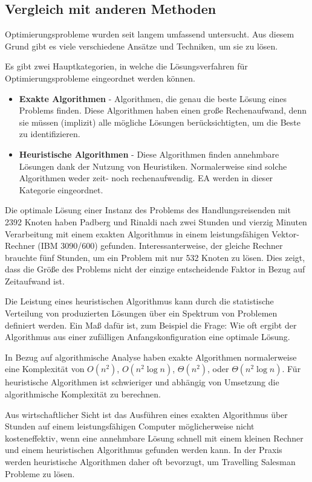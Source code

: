 \documentclass[twoside,twocolumn]{article}
\begin{document}
\subsection{Vergleich mit anderen Methoden}
Optimierungsprobleme wurden seit langem umfassend untersucht. Aus diesem Grund gibt es viele verschiedene Ansätze und Techniken, um sie zu lösen.\par
Es gibt zwei Hauptkategorien, in welche die Lösungsverfahren für Optimierungsprobleme eingeordnet werden können.
\begin{itemize}
\item{\textbf{Exakte Algorithmen} - Algorithmen, die genau die beste Lösung eines Problems finden. Diese Algorithmen haben einen große Rechenaufwand, denn sie müssen (implizit) alle mögliche Lösungen berücksichtigten, um die Beste zu identifizieren.}
\item{\textbf{Heuristische Algorithmen} - Diese Algorithmen finden annehmbare Lösungen dank der Nutzung von Heuristiken. Normalerweise sind solche Algorithmen weder zeit- noch rechenaufwendig. EA werden in dieser Kategorie eingeordnet.}
\end{itemize}

Die optimale Lösung einer Instanz des Problems des Handlungsreisenden mit 2392 Knoten haben Padberg und Rinaldi \cite{exact_algorithms_A} \cite{exact_algorithms_B} nach zwei Stunden und vierzig Minuten Verarbeitung mit einem exakten Algorithmus in einem leistungsfähigen Vektor-Rechner (IBM 3090/600) gefunden. Interessanterweise, der gleiche Rechner brauchte fünf Stunden, um ein Problem mit nur 532 Knoten zu lösen. Dies zeigt, dass die Größe des Problems nicht der einzige entscheidende Faktor in Bezug auf Zeitaufwand ist.\par

Die Leistung eines heuristischen Algorithmus kann durch die statistische Verteilung von produzierten Lösungen über ein Spektrum von Problemen definiert werden. Ein Maß dafür ist, zum Beispiel die Frage: Wie oft ergibt der Algorithmus aus einer zufälligen Anfangskonfiguration eine optimale Lösung.\par

In Bezug auf algorithmische Analyse haben exakte Algorithmen normalerweise eine Komplexität von $O(n^2)$, $O(n^2\log n)$, $\Theta(n^2)$, oder $\Theta(n^2\log n)$. Für heuristische Algorithmen ist schwieriger und abhängig von Umsetzung die algorithmische Komplexität zu berechnen.\par

Aus wirtschaftlicher Sicht ist das Ausführen eines exakten Algorithmus über Stunden auf einem leistungsfähigen Computer möglicherweise nicht kosteneffektiv, wenn eine annehmbare Lösung schnell mit einem kleinen Rechner und einem heuristischen Algorithmus gefunden werden kann. In der Praxis werden heuristische Algorithmen daher oft bevorzugt, um Travelling Salesman Probleme zu lösen.
\end{document}
